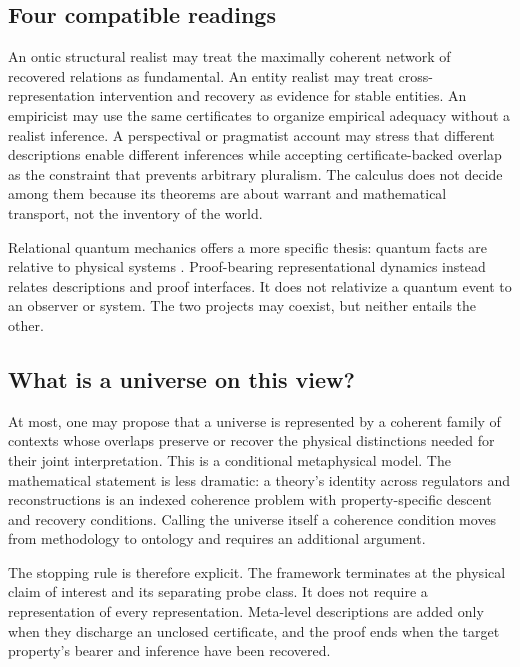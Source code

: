\subsection{Four compatible readings}

An ontic structural realist may treat the maximally coherent network of
recovered relations as fundamental.  An entity realist may treat cross-
representation intervention and recovery as evidence for stable entities.
An empiricist may use the same certificates to organize empirical adequacy
without a realist inference.  A perspectival or pragmatist account may stress
that different descriptions enable different inferences while accepting
certificate-backed overlap as the constraint that prevents arbitrary
pluralism.  The calculus does not decide among them because its theorems are
about warrant and mathematical transport, not the inventory of the world.

Relational quantum mechanics offers a more specific thesis: quantum facts are
relative to physical systems \cite{Rovelli1996}.  Proof-bearing
representational dynamics instead relates descriptions and proof interfaces.
It does not relativize a quantum event to an observer or system.  The two
projects may coexist, but neither entails the other.

\subsection{What is a universe on this view?}

At most, one may propose that a universe is represented by a coherent family
of contexts whose overlaps preserve or recover the physical distinctions
needed for their joint interpretation.  This is a conditional metaphysical
model.  The mathematical statement is less dramatic: a theory's identity
across regulators and reconstructions is an indexed coherence problem with
property-specific descent and recovery conditions.  Calling the universe
itself a coherence condition moves from methodology to ontology and requires
an additional argument.

The stopping rule is therefore explicit.  The framework terminates at the
physical claim of interest and its separating probe class.  It does not
require a representation of every representation.  Meta-level descriptions
are added only when they discharge an unclosed certificate, and the proof
ends when the target property's bearer and inference have been recovered.

